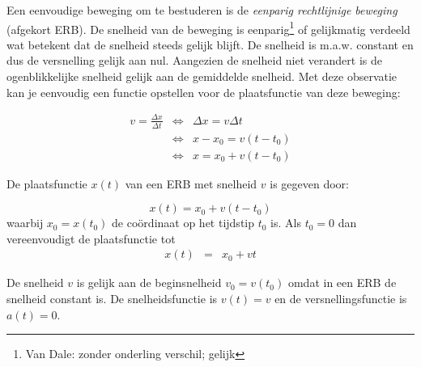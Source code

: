 \documentclass{ximera}
\begin{document}
	\author{Bart Lambregs}
    \xmsource\xmuitleg




Een eenvoudige beweging om te bestuderen is de \emph{eenparig rechtlijnige beweging} (afgekort ERB). 
De snelheid van de beweging is eenparig\footnote{Van Dale: zonder onderling verschil; gelijk} of gelijkmatig verdeeld wat betekent dat de snelheid steeds gelijk blijft. 
De snelheid is m.a.w. constant en dus de versnelling gelijk aan nul. 
Aangezien de snelheid niet verandert is de ogenblikkelijke snelheid gelijk aan de gemiddelde snelheid. 
Met deze observatie kan je eenvoudig een functie opstellen voor de plaatsfunctie van deze beweging:

\[
\begin{array}{rcl}

v=\frac{\Delta x}{\Delta t} & \Leftrightarrow & \Delta x=v\Delta t \\
&\Leftrightarrow & x-x_0=v(t-t_0) \\
&\Leftrightarrow & x=x_0+v(t-t_0)

\end{array}
\]

\begin{theorem}
De plaatsfunctie $x(t)$ van een ERB met snelheid $v$ is gegeven door:

\[
x(t)=x_0+v(t-t_0)
\]
waarbij $x_0=x(t_0)$ de coördinaat op het tijdstip $t_0$ is. Als $t_0=0$ dan vereenvoudigt de plaatsfunctie tot
\begin{eqnarray}%
x(t)&=&x_0+vt
\end{eqnarray}

\end{theorem}

De snelheid $v$ is gelijk aan de beginsnelheid $v_0=v(t_0)$ omdat in een ERB de snelheid constant is. De snelheidsfunctie is $v(t)=v$ en de versnellingsfunctie is $a(t)=0$.
\end{document}
